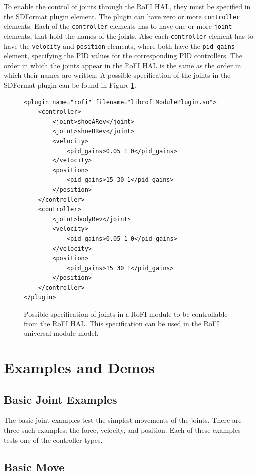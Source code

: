 \documentclass[
  printed, %
  color,   %
  notable, %
  oneside, %
  nolof,   %
  nolot,   %
  nocover,
]{fithesis3}
\newcommand{\code}[1]{\texttt{#1}}
\begin{document}
To enable the control of joints through the RoFI HAL, they must be specified in the SDFormat plugin element.
The plugin can have zero or more \code{controller} elements.
Each of the \code{controller} elements has to have one or more \code{joint} elements, that hold the names of the joints.
Also each \code{controller} element has to have the \code{velocity} and \code{position} elements, where both have the \code{pid\_gains} element, specifying the PID values for the corresponding PID controllers.
The order in which the joints appear in the RoFI HAL is the same as the order in which their names are written.
A possible specification of the joints in the SDFormat plugin can be found in Figure \ref{fig:plugin-sdf}.

\begin{figure}
    \centering
\begin{verbatim}
<plugin name="rofi" filename="librofiModulePlugin.so">
    <controller>
        <joint>shoeARev</joint>
        <joint>shoeBRev</joint>
        <velocity>
            <pid_gains>0.05 1 0</pid_gains>
        </velocity>
        <position>
            <pid_gains>15 30 1</pid_gains>
        </position>
    </controller>
    <controller>
        <joint>bodyRev</joint>
        <velocity>
            <pid_gains>0.05 1 0</pid_gains>
        </velocity>
        <position>
            <pid_gains>15 30 1</pid_gains>
        </position>
    </controller>
</plugin>
\end{verbatim}
    \caption{Possible specification of joints in a RoFI module to be controllable from the RoFI HAL. This specification can be used in the RoFI universal module model.}
    \label{fig:plugin-sdf}
\end{figure}


\chapter{Examples and Demos}

\section{Basic Joint Examples}

The basic joint examples test the simplest movements of the joints.
There are three such examples: the force, velocity, and position.
Each of these examples tests one of the controller types.

\section{Basic Move}
\end{document}
